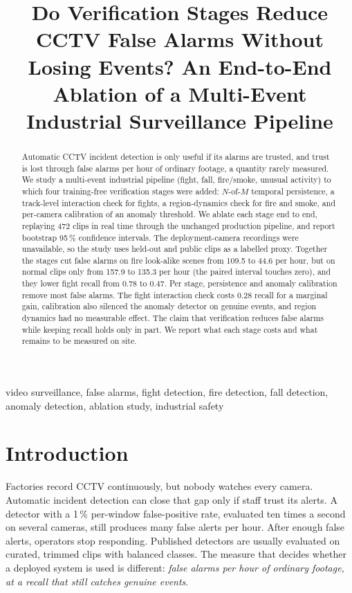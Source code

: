 \documentclass[conference]{IEEEtran}
\begin{document}
\title{Do Verification Stages Reduce CCTV False Alarms Without Losing Events? An End-to-End Ablation of a Multi-Event Industrial Surveillance Pipeline}

\author{
}

\maketitle

\begin{abstract}
Automatic CCTV incident detection is only useful if its alarms are trusted, and trust is lost through false alarms per hour of ordinary footage, a quantity rarely measured. We study a multi-event industrial pipeline (fight, fall, fire/smoke, unusual activity) to which four training-free verification stages were added: $N$-of-$M$ temporal persistence, a track-level interaction check for fights, a region-dynamics check for fire and smoke, and per-camera calibration of an anomaly threshold. We ablate each stage end to end, replaying 472 clips in real time through the unchanged production pipeline, and report bootstrap 95\,\% confidence intervals. The deployment-camera recordings were unavailable, so the study uses held-out and public clips as a labelled proxy. Together the stages cut false alarms on fire look-alike scenes from 109.5 to 44.6 per hour, but on normal clips only from 157.9 to 135.3 per hour (the paired interval touches zero), and they lower fight recall from 0.78 to 0.47. Per stage, persistence and anomaly calibration remove most false alarms. The fight interaction check costs 0.28 recall for a marginal gain, calibration also silenced the anomaly detector on genuine events, and region dynamics had no measurable effect. The claim that verification reduces false alarms while keeping recall holds only in part. We report what each stage costs and what remains to be measured on site.
\end{abstract}

\begin{IEEEkeywords}
video surveillance, false alarms, fight detection, fire detection, fall detection, anomaly detection, ablation study, industrial safety
\end{IEEEkeywords}

\section{Introduction}
Factories record CCTV continuously, but nobody watches every camera. Automatic incident detection can close that gap only if staff trust its alerts. A detector with a 1\,\% per-window false-positive rate, evaluated ten times a second on several cameras, still produces many false alerts per hour. After enough false alerts, operators stop responding. Published detectors are usually evaluated on curated, trimmed clips with balanced classes. The measure that decides whether a deployed system is used is different: \emph{false alarms per hour of ordinary footage, at a recall that still catches genuine events}.
\end{document}
